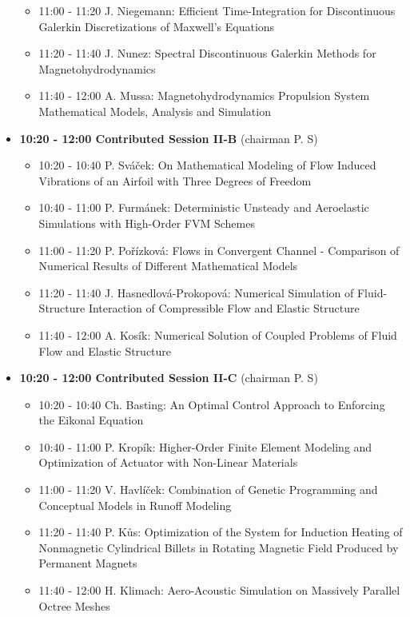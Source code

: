 \documentclass[10pt, A4]{article}%
\begin{document}
\begin{itemize}
\begin{itemize}
    \item 11:00 - 11:20 J. Niegemann: Efficient Time-Integration for Discontinuous Galerkin Discretizations of Maxwell's Equations
    \item 11:20 - 11:40 J. Nunez: Spectral Discontinuous Galerkin Methods for Magnetohydrodynamics
    \item 11:40 - 12:00 A. Mussa: Magnetohydrodynamics Propulsion System Mathematical Models,
Analysis and Simulation
  \end{itemize}
  \item {\bf 10:20 - 12:00 Contributed Session II-B} (chairman P. S) 
  \begin{itemize}
    \item 10:20 - 10:40 P. Sv\'{a}\v{c}ek: On Mathematical Modeling of Flow Induced Vibrations of an Airfoil with Three Degrees of Freedom
    \item 10:40 - 11:00 P. Furm\'{a}nek: Deterministic Unsteady and Aeroelastic Simulations with High-Order FVM Schemes
    \item 11:00 - 11:20 P. Po\v{r}\'{i}zkov\'{a}: Flows in Convergent Channel - Comparison of Numerical Results of Different Mathematical Models
    \item 11:20 - 11:40 J. Hasnedlov\'{a}-Prokopov\'{a}: Numerical Simulation of Fluid-Structure Interaction of Compressible Flow and Elastic Structure
    \item 11:40 - 12:00 A. Kos\'{i}k: Numerical Solution of Coupled Problems of Fluid Flow and Elastic Structure   
  \end{itemize}
    \item {\bf 10:20 - 12:00 Contributed Session II-C} (chairman P. S) 
  \begin{itemize}
    \item 10:20 - 10:40 Ch. Basting: An Optimal Control Approach to Enforcing the Eikonal Equation
    \item 10:40 - 11:00 P. Krop\'{i}k: Higher-Order Finite Element Modeling and Optimization of Actuator with Non-Linear Materials
    \item 11:00 - 11:20 V. Havl\'{i}\v{c}ek: Combination of Genetic Programming and Conceptual Models in Runoff Modeling
    \item 11:20 - 11:40 P. K\r{u}s: Optimization of the System for Induction Heating of Nonmagnetic Cylindrical Billets in Rotating Magnetic Field Produced by Permanent Magnets
    \item 11:40 - 12:00 H. Klimach: Aero-Acoustic Simulation on Massively Parallel Octree Meshes

\end{itemize}
\end{itemize}
\end{document}
